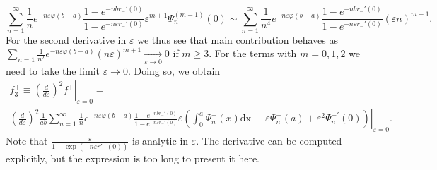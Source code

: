 \documentclass{article}
\newcommand{\dx}{\mathrm{dx}~}
\begin{document}
\begin{equation}
  \label{eq:70}
  \sum_{n=1}^{\infty} \frac{1}{n} e^{-n\varepsilon\varphi(b-a)}
  \frac{1-e^{-nbr_{-}'(0)}}{1-e^{-n\varepsilon r_{-}'(0)}} \varepsilon^{m+1}\Psi_{n}^{(m-1)}(0)\sim
  \sum_{n=1}^{\infty} \frac{1}{n^{4}} e^{-n\varepsilon\varphi(b-a)}
  \frac{1-e^{-nbr_{-}'(0)}}{1-e^{-n\varepsilon r_{-}'(0)}} (\varepsilon n )^{m+1}.
\end{equation}
For the second derivative in $\varepsilon$ we thus see that main contribution behaves as
$\sum_{n=1}\frac{1}{n^{2}}e^{-n\varepsilon\varphi(b-a)}
  (n\varepsilon)^{m+1}\xrightarrow[\varepsilon\to 0]{}0$
if $m\geq 3$. For the terms with $m=0,1,2$ we need to
take the limit $\varepsilon\to 0$. Doing so, we obtain
\begin{multline}
  \label{eq:71}
  f^{+}_{3}\equiv\left.\left(\frac{d}{d\varepsilon}\right)^{2} f^{+}\right|_{\varepsilon=0} =\\
  \left.\left(\frac{d}{d\varepsilon}\right)^{2}\frac{1}{ab}\sum_{n=1}^{\infty} \frac{1}{n}
  e^{-n\varepsilon\varphi(b-a)} \frac{1-e^{-nbr_{-}'(0)}}{1-e^{-n\varepsilon r_{-}'(0)}}
  \varepsilon\left(\int_{0}^{a} \Psi_{n}^{+}(x) \dx -\varepsilon \Psi_{n}^{+}(a) +\varepsilon^{2}\Psi^{+'}_{n}(0)\right)\right|_{\varepsilon=0}.
\end{multline}
Note that $\frac{\varepsilon}{1-\exp(-n\varepsilon r'_{-}(0))}$ is analytic in $\varepsilon$. 
The derivative can be computed explicitly, but the expression is too long to present it here.
\end{document}
